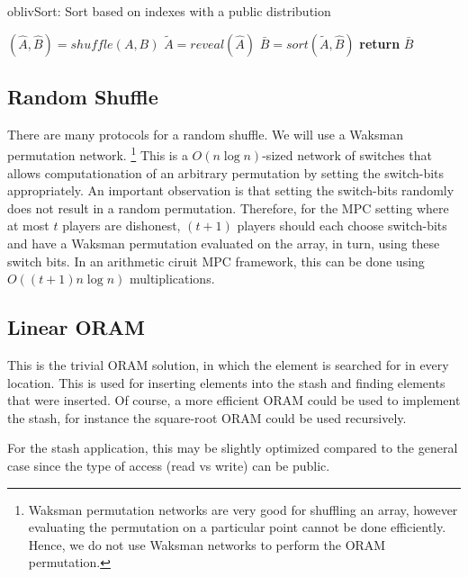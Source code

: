 \begin{algorithm}
\caption{oblivSort: Sort based on indexes with a public distribution}
\label{fig:OblivSort}
\begin{algorithmic}[0]

\State $(\hat{A} , \hat{B}) = shuffle(A, B)$
\State $\tilde{A} = reveal(\hat{A})$
\State $\bar{B} = sort(\tilde{A}, \hat{B})$
\State \textbf{return} $\bar{B}$
\EndProcedure

\end{algorithmic}
\end{algorithm}

\subsection{Random Shuffle}

There are many protocols for a random shuffle.
We will use a Waksman permutation network.
\footnote{Waksman permutation networks are very good for shuffling an array,
however evaluating the permutation on a particular point cannot be done
efficiently. Hence, we do not use Waksman networks to perform the ORAM permutation.}
This is a $O(n \log{n})$-sized network of switches that allows computationation
of an arbitrary permutation by setting the switch-bits appropriately.
An important observation is that setting the switch-bits randomly
does not result in a random permutation.
Therefore, for the MPC setting where at most $t$ players are dishonest,
$(t+1)$ players should each choose switch-bits and have a Waksman permutation
evaluated on the array, in turn, using these switch bits.  
In an arithmetic ciruit MPC framework, this can be done using $O( (t+1) n \log{n})$ multiplications.

\subsection{Linear ORAM}

This is the trivial ORAM solution, in which the element is searched for
in every location.
This is used for inserting elements into the stash and finding
elements that were inserted.
Of course, a more efficient ORAM could be used to implement the stash,
for instance the square-root ORAM could be used recursively.

For the stash application, this may be slightly optimized compared to the 
general case since the type of access (read vs write) can be public.

